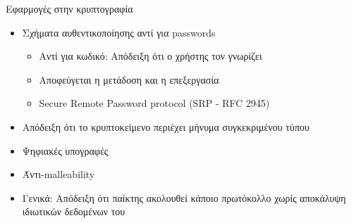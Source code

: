 \documentclass[handout]{beamer}
\begin{document}
\begin{frame}{Εφαρμογές στην κρυπτογραφία}
\begin{itemize}
\item Σχήματα αυθεντικοποίησης αντί για passwords
\begin{itemize}
\item Αντί για κωδικό: Απόδειξη ότι ο χρήστης τον γνωρίζει
\item Αποφεύγεται η μετάδοση και η επεξεργασία
\item Secure Remote Password protocol (SRP  - RFC 2945)
\end{itemize}
\pause
\item Απόδειξη ότι το κρυπτοκείμενο περιέχει μήνυμα συγκεκριμένου τύπου
\pause
\item Ψηφιακές υπογραφές
\item Άντι-malleability
\pause 
\item Γενικά: Απόδειξη ότι παίκτης ακολουθεί κάποιο πρωτόκολλο χωρίς αποκάλυψη ιδιωτικών δεδομένων του
\end{itemize}
\end{frame}
\end{document}
